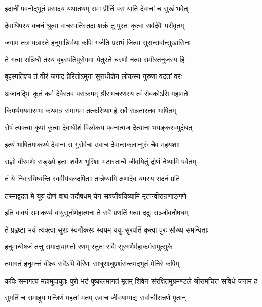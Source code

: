 \twolineshloka
{इदानीं पवनोद्भूतं प्रसादय यथातथम्}
{रामः प्रीतिं परां याति देवानां च सुखं भवेत्}%

\twolineshloka
{देवाधिपस्य वचनं श्रुत्वा वाचस्पतिस्तदा}
{शक्रं तु पुरतः कृत्वा सर्वदेवैः परीवृतम्}%

\twolineshloka
{जगाम तत्र यत्रास्ते हनूमान्निर्भयः कपिः}
{गर्जति प्रसभं जित्वा सुरान्सर्वान्सुखासिनः}%

\twolineshloka
{ते गत्वा सन्निधौ तस्य बृहस्पतिपुरोगमाः}
{पेतुस्ते चरणौ नत्वा समीरतनुजस्य हि}%

\twolineshloka
{बृहस्पतिश्च तं वीरं जगाद प्रेरितोऽमुना}
{सुराधीशेन लोकस्य गुरुणा वदतां वरः}%

\twolineshloka
{अजानद्भिः कृतं कर्म देवैस्तव पराक्रमम्}
{श्रीरामचरणस्य त्वं सेवकोऽसि महामते}%

\twolineshloka
{किमर्थमयमारम्भः कथमत्र समागमः}
{तत्करिष्यामहे सर्वे सन्नतास्तव भाषितम्}%

\twolineshloka
{रोषं त्यक्त्वा कृपां कृत्वा देवाधीशं विलोकय}
{पवनात्मज दैत्यानां भयङ्करवपुर्दधत्}%


\twolineshloka
{इत्थं भाषितमाकर्ण्य देवानां स गुरोर्वचः}
{उवाच देवान्सकलान्गुरुं चैव महयशाः}%

\twolineshloka
{राज्ञो वीरमणेः सङ्ख्ये हताः शर्वेण भूरिशः}
{भटास्तान्वै जीवयितुं द्रोणं नेष्यामि पर्वतम्}%

\twolineshloka
{तं ये निवारयिष्यन्ति स्ववीर्यबलदर्पिताः}
{तान्नेष्यामि क्षणादेव यमस्य सदनं प्रति}%

\twolineshloka
{तस्माद्वदत मे यूयं द्रोणं वाथ तदौषधम्}
{येन सञ्जीवयिष्यामि मृतान्वीरान्रणाङ्गणे}%


\twolineshloka
{इति वाक्यं समाकर्ण्य वायुसूनोर्महात्मनः}
{ते सर्वे प्रणतिं गत्वा ददुः सञ्जीवनौषधम्}%

\twolineshloka
{ते प्रहृष्टा भयं त्यक्त्वा सुराः स्वर्गौकसः स्वयम्}
{ययुः सुरपतिं कृत्वा पुरः सौख्य समन्विताः}%

\twolineshloka
{हनुमान्भेषजं तत्तु समादायागतो रणम्}
{स्तुतः सर्वैः सुरगणैर्महाकर्मसमुत्सुकैः}%

\twolineshloka
{तमागतं हनूमन्तं वीक्ष्य सर्वेऽपि वैरिणः}
{साधुसाधुप्रशंसन्तमद्भुतं मेनिरे कपिम्}%

\fourlineindentedshloka
{कपिः समागत्य महामुदायुतः}
{पुरो भटं पुष्कलमागतं मृतम्}
{शिवेन संरक्षितमुग्रमण्डले}
{श्रीरामचित्तं सविधे जगाम ह}%

\twolineshloka
{सुमतिं च समाहूय मन्त्रिणं महतां मतम्}
{उवाच जीवयाम्यद्य सर्वान्वीरान्रणे मृतान्}%

